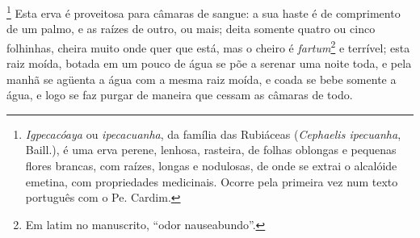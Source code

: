 \footnote{ \textit{Igpecacóaya} ou \textit{
ipecacuanha}, da família das Rubiáceas (\textit{Cephaelis ipecuanha}, Baill.),
é uma erva perene, lenhosa, rasteira, de
folhas oblongas e pequenas flores brancas, com raízes, longas e
nodulosas, de onde se extrai o alcalóide emetina, com propriedades
medicinais. Ocorre pela primeira vez num texto português com o Pe.
Cardim.} Esta erva é proveitosa para câmaras de sangue: a
sua haste é de comprimento de um palmo, e as raízes de outro, ou mais;
deita somente quatro ou cinco folhinhas, cheira muito onde quer que
está, mas o cheiro é \textit{fartum}\footnote{ Em latim no manuscrito, ``odor nauseabundo''.} e
terrível; esta raiz moída, botada em um pouco de água se põe a serenar
uma noite toda, e pela manhã se agüenta a água com a mesma raiz moída,
e coada se bebe somente a água, e logo se faz purgar de maneira que
cessam as câmaras de todo.

